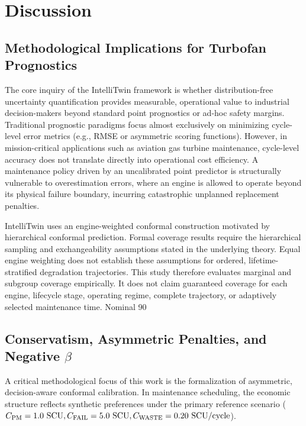 \section{Discussion}
\label{sec:discussion}

\subsection{Methodological Implications for Turbofan Prognostics}
The core inquiry of the IntelliTwin framework is whether distribution-free uncertainty quantification provides measurable, operational value to industrial decision-makers beyond standard point prognostics or ad-hoc safety margins. Traditional prognostic paradigms focus almost exclusively on minimizing cycle-level error metrics (e.g., RMSE or asymmetric scoring functions). However, in mission-critical applications such as aviation gas turbine maintenance, cycle-level accuracy does not translate directly into operational cost efficiency. A maintenance policy driven by an uncalibrated point predictor is structurally vulnerable to overestimation errors, where an engine is allowed to operate beyond its physical failure boundary, incurring catastrophic unplanned replacement penalties.

IntelliTwin uses an engine-weighted conformal construction motivated by hierarchical conformal prediction. Formal coverage results require the hierarchical sampling and exchangeability assumptions stated in the underlying theory. Equal engine weighting does not establish these assumptions for ordered, lifetime-stratified degradation trajectories. This study therefore evaluates marginal and subgroup coverage empirically. It does not claim guaranteed coverage for each engine, lifecycle stage, operating regime, complete trajectory, or adaptively selected maintenance time. Nominal 90%

\subsection{Conservatism, Asymmetric Penalties, and Negative $\beta$}
A critical methodological focus of this work is the formalization of asymmetric, decision-aware conformal calibration. In maintenance scheduling, the economic structure reflects synthetic preferences under the primary reference scenario ($C_{\text{PM}} = 1.0~\text{SCU}, C_{\text{FAIL}} = 5.0~\text{SCU}, C_{\text{WASTE}} = 0.20~\text{SCU}/\text{cycle}$).

